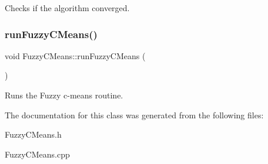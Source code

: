 Checks if the algorithm converged. \mbox{\label{class_fuzzy_c_means_a79db259f351e533d5c9d011b41935152}} 
\subsubsection{\texorpdfstring{run\+Fuzzy\+C\+Means()}{runFuzzyCMeans()}}
{\footnotesize\ttfamily void Fuzzy\+C\+Means\+::run\+Fuzzy\+C\+Means (\begin{DoxyParamCaption}{ }\end{DoxyParamCaption})}

Runs the Fuzzy c-\/means routine. 

The documentation for this class was generated from the following files\+:\begin{DoxyCompactItemize}
\item 
Fuzzy\+C\+Means.\+h\item 
Fuzzy\+C\+Means.\+cpp\end{DoxyCompactItemize}
